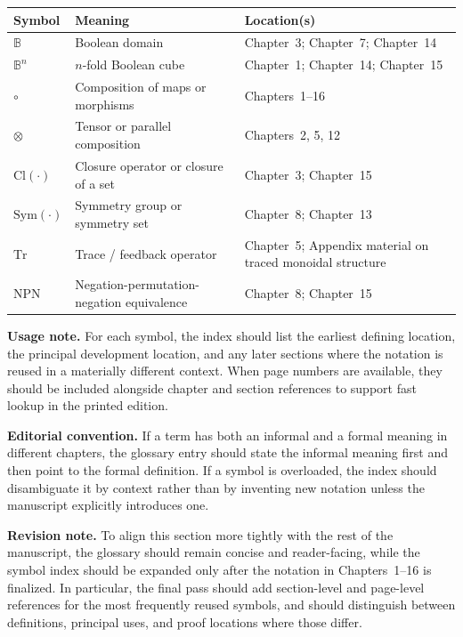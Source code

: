 \documentclass[11pt]{article}
\begin{document}
\begin{center}
\begin{tabular}{|l|l|l|}
\hline
\textbf{Symbol} & \textbf{Meaning} & \textbf{Location(s)} \\
\hline
$\mathbb{B}$ & Boolean domain & Chapter~3; Chapter~7; Chapter~14 \\
\hline
$\mathbb{B}^n$ & $n$-fold Boolean cube & Chapter~1; Chapter~14; Chapter~15 \\
\hline
$\circ$ & Composition of maps or morphisms & Chapters~1--16 \\
\hline
$\otimes$ & Tensor or parallel composition & Chapters~2, 5, 12 \\
\hline
$\mathrm{Cl}(\cdot)$ & Closure operator or closure of a set & Chapter~3; Chapter~15 \\
\hline
$\mathrm{Sym}(\cdot)$ & Symmetry group or symmetry set & Chapter~8; Chapter~13 \\
\hline
$\mathrm{Tr}$ & Trace / feedback operator & Chapter~5; Appendix material on traced monoidal structure \\
\hline
$\mathrm{NPN}$ & Negation-permutation-negation equivalence & Chapter~8; Chapter~15 \\
\hline
\end{tabular}
\end{center}

\medskip

\noindent\textbf{Usage note.} For each symbol, the index should list the earliest defining location, the principal development location, and any later sections where the notation is reused in a materially different context. When page numbers are available, they should be included alongside chapter and section references to support fast lookup in the printed edition.

\medskip

\noindent\textbf{Editorial convention.} If a term has both an informal and a formal meaning in different chapters, the glossary entry should state the informal meaning first and then point to the formal definition. If a symbol is overloaded, the index should disambiguate it by context rather than by inventing new notation unless the manuscript explicitly introduces one.

\medskip

\noindent\textbf{Revision note.} To align this section more tightly with the rest of the manuscript, the glossary should remain concise and reader-facing, while the symbol index should be expanded only after the notation in Chapters~1--16 is finalized. In particular, the final pass should add section-level and page-level references for the most frequently reused symbols, and should distinguish between definitions, principal uses, and proof locations where those differ.
\end{document}
